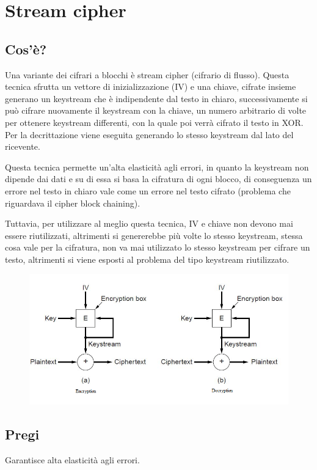 \section{Stream cipher}
\subsection{Cos'è?}
Una variante dei cifrari a blocchi è stream cipher (cifrario di flusso).
Questa tecnica sfrutta un vettore di inizializzazione (IV) e una chiave, cifrate insieme generano un keystream che è indipendente dal testo in chiaro, successivamente si può cifrare nuovamente il keystream con la chiave, un numero arbitrario di volte per ottenere keystream differenti, con la quale poi verrà cifrato il testo in XOR.
Per la decrittazione viene eseguita generando lo stesso keystream dal lato del ricevente.

Questa tecnica permette un'alta elasticità agli errori, in quanto la keystream non dipende dai dati e su di essa si basa la cifratura di ogni blocco, di conseguenza un errore nel testo in chiaro vale come un errore nel testo cifrato (problema che riguardava il cipher block chaining).

Tuttavia, per utilizzare al meglio questa tecnica, IV e chiave non devono mai essere riutilizzati, altrimenti si genererebbe più volte lo stesso keystream, stessa cosa vale per la cifratura, non va mai utilizzato lo stesso keystream per cifrare un testo, altrimenti si viene esposti al problema del tipo keystream riutilizzato.

\begin{figure}[H]
\centering
\includegraphics[scale=0.6]{res/img/56_StreamCipher.png}
\end{figure} 

\subsection{Pregi}
Garantisce alta elasticità agli errori.
